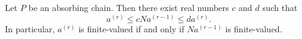Let $P$ be an absorbing chain. Then there exist real numbers $c$ and $d$ such that
$$a^{(r)} \leq c N a^{(r-1)} \leq d a^{(r)}.$$
In particular, $a^{(r)}$ is finite-valued if and only if $N a^{(r-1)}$ is finite-valued.
